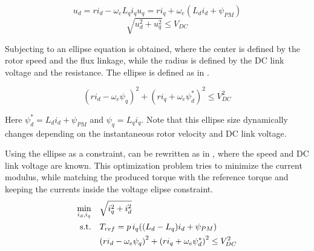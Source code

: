 \begin{subequations}
	\begin{equation}
		u_d = r i_d -\omega_e L_q i_q
	\end{equation}
	\begin{equation}
		u_q =  r i_q + \omega_e (L_d i_d +\psi_{PM})
	\end{equation}
    \label{eq:voltage_constraint_model} %
\end{subequations}
\begin{equation}
	\sqrt{u_d^2+u_q^2}\leq V_{DC}
    \label{eq:voltage_constraint_vdc} %
\end{equation}

Subjecting  to  an ellipse equation is obtained, where the center is defined by the rotor speed and the flux linkage, while the radius is defined by the DC link voltage and the resistance. The ellipse is defined as in .

\begin{equation}
	{(r i_d -\omega_e \psi_q)}^2 + {(r i_q + \omega_e \psi^*_d)}^2\leq V_{DC}^2
	\label{eq:voltage_ellipse} %
\end{equation}

Here $\psi^*_d = L_d i_d + \psi_{PM}$ and $\psi_q = L_q i_q$. Note that this ellipse size dynamically changes depending on the instantaneous rotor velocity and DC link voltage.

Using the ellipse as a constraint,  can be rewritten as in , where the speed and DC link voltage are known.
This optimization problem tries to minimize the current modulus, while matching the produced torque with the reference torque and keeping the currents inside the voltage elipse constraint.
\begin{equation}
	\begin{aligned}
		\min_{i_d,i_q} \quad & \sqrt{i_q^2 + i_d^2} \\
		\rm{s.t.}  \quad & T_{ref} = p\, i_q((L_d - L_q)i_d + \psi_{PM})\\
		               \quad & {(r i_d -\omega_e \psi_q)}^2 + {(r i_q + \omega_e \psi^*_d)}^2\leq V_{DC}^2            \\
	\end{aligned}
	\label{eq:mtpa_problem_with_voltage_constraint} %
\end{equation}

